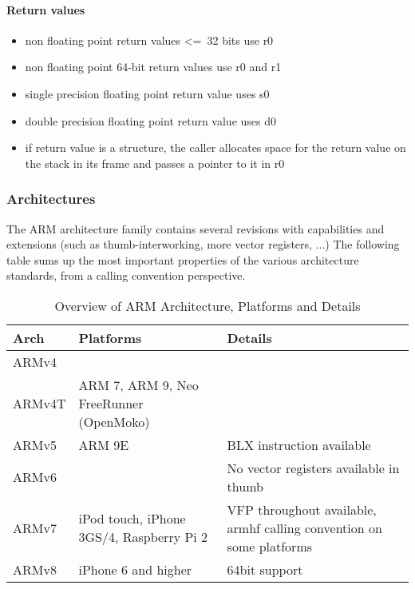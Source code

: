 \paragraph{Return values}
\begin{itemize}
\item non floating point return values \textless=\ 32 bits use r0
\item non floating point 64-bit return values use r0 and r1
\item single precision floating point return value uses s0
\item double precision floating point return value uses d0
\item if return value is a structure, the caller allocates space for the return value on the stack in its frame and passes a pointer to it in r0
\end{itemize}




\subsubsection{Architectures}

The ARM architecture family contains several revisions with capabilities and
extensions (such as thumb-interworking, more vector registers, ...)
The following table sums up the most important properties of the various
architecture standards, from a calling convention perspective.


\begin{table}[h]
\begin{tabular*}{0.95\textwidth}{lll}
Arch   & Platforms & Details \\
\hline
ARMv4  & & \\
ARMv4T & ARM 7, ARM 9, Neo FreeRunner (OpenMoko) & \\
ARMv5  & ARM 9E & BLX instruction available \\
ARMv6  & & No vector registers available in thumb \\
ARMv7  & iPod touch, iPhone 3GS/4, Raspberry Pi 2 & VFP throughout available, armhf calling convention on some platforms \\
ARMv8  & iPhone 6 and higher & 64bit support \\
\end{tabular*}
\caption{Overview of ARM Architecture, Platforms and Details}
\end{table}

\newpage

